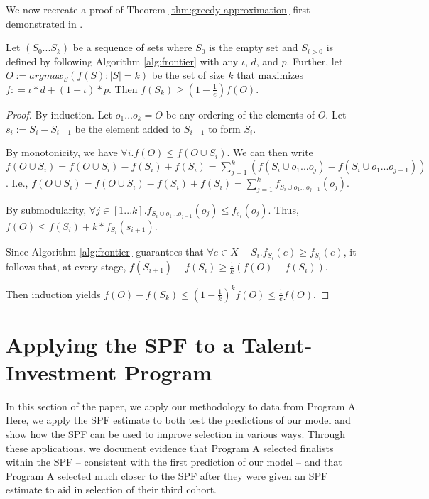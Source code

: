 We now recreate a proof of Theorem \ref{thm:greedy-approximation} first demonstrated in \cite{nemhauser1978analysis}.

\begin{theorem}\label{thm:greedy-approximation}
    Let $(S_0...S_k)$ be a sequence of sets where $S_0$ is the empty set and $S_{i>0}$ is defined by following Algorithm \ref{alg:frontier} with any $\iota$, $d$, and $p$. Further, let $O := argmax_S(f(S) : |S| = k)$ be the set of size $k$ that maximizes $f: = \iota*d+(1-\iota)*p$. Then $f(S_k) \geq (1 - \frac{1}{e})f(O)$.
\end{theorem}

\begin{proof}
By induction. Let ${o_1...o_k} = O$ be any ordering of the elements of $O$. Let ${s_i} := S_i - S_{i-1}$ be the element added to $S_{i-1}$ to form $S_i$.

By monotonicity, we have $\forall i . f(O) \leq f(O \cup S_i)$.  We can then write $f(O \cup S_i) = f(O \cup S_i) - f(S_i) + f(S_i) = \sum_{j=1}^{k} (f(S_i \cup {o_1...o_j}) - f(S_i \cup {o_1...o_{j-1}}))$. I.e., $f(O \cup S_i) = f(O \cup S_i) - f(S_i) + f(S_i) = \sum_{j=1}^{k} f_{S_i \cup {o_1...o_{j-1}}}(o_j)$.

By submodularity, $\forall j \in [1...k] . f_{S_i \cup {o_1...o_{j-1}}}(o_j) \leq f_{s_i}(o_j)$. Thus, $f(O) \leq f(S_i) + k*f_{S_i}(s_{i+1})$. 

Since Algorithm \ref{alg:frontier} guarantees that $\forall e \in X - S_i . f_{S_i}(e) \geq f_{S_i}(e)$, it follows that, at every stage, $f(S_{i+1}) - f(S_i) \geq \frac{1}{k} (f(O) - f(S_i))$.

Then induction yields $f(O) - f(S_k) \leq (1 - \frac{1}{k})^k f(O) \leq \frac{1}{e} f(O)$.
\end{proof}

\section{Applying the SPF to a Talent-Investment Program}\label{sec:spfcase}

In this section of the paper, we apply our methodology to data from Program A. Here, we apply the SPF estimate to both test the predictions of our model and show how the SPF can be used to improve selection in various ways. Through these applications, we document evidence that Program A selected finalists within the SPF -- consistent with the first prediction of our model -- and that Program A selected much closer to the SPF after they were given an SPF estimate to aid in selection of their third cohort.

